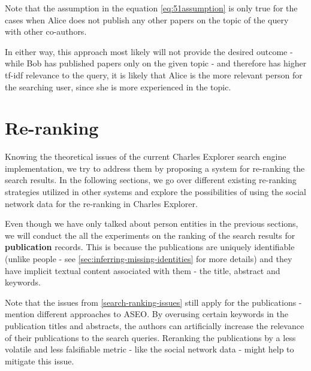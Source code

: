 Note that the assumption in the equation \ref{eq:51assumption} is only true for the cases when Alice does not publish any other papers on the topic of the query with other co-authors.


In either way, this approach most likely will not provide the desired outcome - while Bob has published papers only on the given topic - and therefore has higher tf-idf relevance to the query,
it is likely that Alice is the more relevant person for the searching user, since she is more experienced in the topic.

\section{Re-ranking}

Knowing the theoretical issues of the current Charles Explorer search engine implementation, we try to address them by proposing a system for re-ranking the search results.
In the following sections, we go over different existing re-ranking strategies utilized in other systems and explore the possibilities of using the social network data 
for the re-ranking in Charles Explorer.

Even though we have only talked about person entities in the previous sections, we will conduct the all the experiments
on the ranking of the search results for \textbf{publication} records.
This is because the publications are uniquely identifiable (unlike people - see \ref{sec:inferring-missing-identities} for more details) 
and they have implicit textual content associated with them - the title, abstract and keywords.

Note that the issues from \ref{search-ranking-issues} still apply for the publications - \cite{aseo} mention different approaches to \ac{ASEO}.
By overusing certain keywords in the publication titles and abstracts, the authors can artificially increase the relevance of their publications to the search queries.
Reranking the publications by a less volatile and less falsifiable metric - like the social network data - might help to mitigate this issue.

